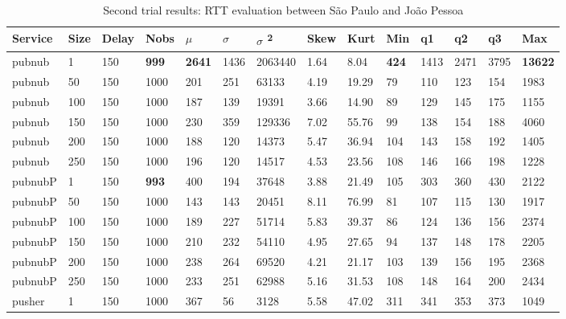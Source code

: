 \begin{table}[!htb]
\small
\centering
\caption{Second trial results: RTT evaluation between São Paulo and João Pessoa}
\label{tab:secondtrialsaojpa}
\begin{tabular}{llllllllllllll}
Service    & Size & Delay & Nobs & $\mu$ & $\sigma$  & $\sigma$ \textsuperscript{2} & Skew & Kurt & Min & q1   & q2   & q3   & Max   \\ \midrule
pubnub     & 1            & 150   & \textbf{999}  & \textbf{2641} & 1436 & 2063440  & 1.64     & 8.04     & \textbf{424} & 1413 & 2471 & 3795 & \textbf{13622} \\
pubnub     & 50           & 150   & 1000 & 201  & 251  & 63133    & 4.19     & 19.29    & 79  & 110  & 123  & 154  & 1983  \\
pubnub     & 100          & 150   & 1000 & 187  & 139  & 19391    & 3.66     & 14.90    & 89  & 129  & 145  & 175  & 1155  \\
pubnub     & 150          & 150   & 1000 & 230  & 359  & 129336   & 7.02     & 55.76    & 99  & 138  & 154  & 188  & 4060  \\
pubnub     & 200          & 150   & 1000 & 188  & 120  & 14373    & 5.47     & 36.94    & 104 & 143  & 158  & 192  & 1405  \\
pubnub     & 250          & 150   & 1000 & 196  & 120  & 14517    & 4.53     & 23.56    & 108 & 146  & 166  & 198  & 1228  \\ \hline
pubnubP & 1            & 150   & \textbf{993}  & 400  & 194  & 37648    & 3.88     & 21.49    & 105 & 303  & 360  & 430  & 2122  \\
pubnubP & 50           & 150   & 1000 & 143  & 143  & 20451    & 8.11     & 76.99    & 81  & 107  & 115  & 130  & 1917  \\
pubnubP & 100          & 150   & 1000 & 189  & 227  & 51714    & 5.83     & 39.37    & 86  & 124  & 136  & 156  & 2374  \\
pubnubP & 150          & 150   & 1000 & 210  & 232  & 54110    & 4.95     & 27.65    & 94  & 137  & 148  & 178  & 2205  \\
pubnubP & 200          & 150   & 1000 & 238  & 264  & 69520    & 4.21     & 21.17    & 103 & 139  & 156  & 195  & 2368  \\
pubnubP & 250          & 150   & 1000 & 233  & 251  & 62988    & 5.16     & 31.53    & 108 & 148  & 164  & 200  & 2434  \\ \hline
pusher     & 1            & 150   & 1000 & 367  & 56   & 3128     & 5.58     & 47.02    & 311 & 341  & 353  & 373  & 1049  \\

\end{tabular}
\end{table}
